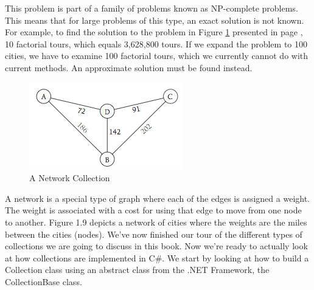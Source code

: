 \documentclass[12pt,a4paper,final,twoside,titlepage]{book}
\begin{document}
This problem is part of a family of problems known as NP-complete problems. This means that for large problems of this type, an exact solution is not known. For example, to find the solution to the problem in Figure \ref{NetworkCollection} presented in page \pageref{NetworkCollection}, 10 factorial tours, which equals 3,628,800 tours. If we expand the problem to 100 cities, we have to examine 100 factorial tours, which we currently cannot do with current methods. An approximate solution must be found instead.
\begin{figure}
\begin{center}
\includegraphics[scale=0.75]{NetworkCollection}
\end{center}
\caption{A Network Collection}
\label{NetworkCollection}
\end{figure}
A network is a special type of graph where each of the edges is assigned a weight. The weight is associated with a cost for using that edge to move from one node to another. Figure 1.9 depicts a network of cities where the weights are the miles between the cities (nodes).
We’ve now finished our tour of the different types of collections we are going to discuss in this book. Now we’re ready to actually look at how collections are implemented in C\#. We start by looking at how to build a Collection class using an abstract class from the .NET Framework, the CollectionBase class.
\end{document}
